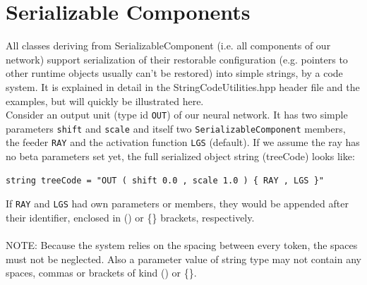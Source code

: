 \documentclass[11pt,a4paper,twoside]{article}
\begin{document}
\section{Serializable Components} %
\label{sec:serializablecomponents}
All classes deriving from SerializableComponent (i.e. all components of our
network) support serialization of their restorable configuration (e.g. pointers
to other runtime objects usually can't be restored) into simple strings, by a
code system. It is explained in detail in
the StringCodeUtilities.hpp header file and the examples, but will quickly be
illustrated here.
\\Consider an output unit (type id \verb+OUT+) of our neural network. It has two simple parameters
\verb+shift+ and \verb+scale+ and itself two \verb+SerializableComponent+ members, the
feeder \verb+RAY+ and the activation function \verb+LGS+ (default). If we
assume the ray has no beta parameters set yet, the full serialized object string (treeCode)
looks like:
\begin{verbatim}
string treeCode = "OUT ( shift 0.0 , scale 1.0 ) { RAY , LGS }"
\end{verbatim}
If \verb+RAY+ and \verb+LGS+ had own parameters or members, they would be appended after their
identifier, enclosed in () or \{\} brackets, respectively.
\\\\NOTE: Because the system relies on the spacing between every token, the
spaces must not be neglected. Also a parameter value of string type may not
contain any spaces, commas or brackets of kind () or \{\}.



\printindex
\end{document}
